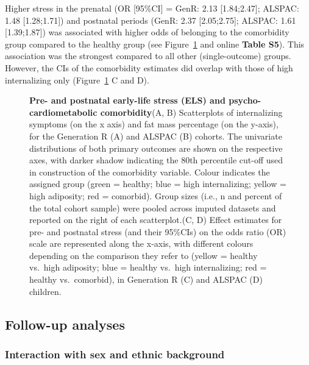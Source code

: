 \documentclass[
  letterpaper,
  DIV=11,
  numbers=noendperiod]{scrreport}
\begin{document}
Higher stress in the prenatal (OR {[}95\%CI{]} = GenR: 2.13
{[}1.84;2.47{]}; ALSPAC: 1.48 {[}1.28;1.71{]}) and postnatal periods
(GenR: 2.37 {[}2.05;2.75{]}; ALSPAC: 1.61 {[}1.39;1.87{]}) was
associated with higher odds of belonging to the comorbidity group
compared to the healthy group (see Figure~\ref{fig-1.4} and online
\textbf{Table S5}). This association was the strongest compared to all
other (single-outcome) groups. However, the CIs of the comorbidity
estimates did overlap with those of high internalizing only
(Figure~\ref{fig-1.4} C and D).

\begin{figure}[H]


\caption{\label{fig-1.4}\textbf{Pre- and postnatal early-life stress
(ELS) and psycho-cardiometabolic comorbidity}\newline(A, B) Scatterplots
of internalizing symptoms (on the x axis) and fat mass percentage (on
the y-axis), for the Generation R (A) and ALSPAC (B) cohorts. The
univariate distributions of both primary outcomes are shown on the
respective axes, with darker shadow indicating the 80th percentile
cut-off used in construction of the comorbidity variable. Colour
indicates the assigned group (green = healthy; blue = high
internalizing; yellow = high adiposity; red = comorbid). Group sizes
(i.e., n and percent of the total cohort sample) were pooled across
imputed datasets and reported on the right of each
scatterplot.\newline(C, D) Effect estimates for pre- and postnatal
stress (and their 95\%CIs) on the odds ratio (OR) scale are represented
along the x-axis, with different colours depending on the comparison
they refer to (yellow = healthy vs.~high adiposity; blue = healthy
vs.~high internalizing; red = healthy vs.~comorbid), in Generation R (C)
and ALSPAC (D) children.}

\end{figure}%

\subsection{Follow-up analyses}\label{follow-up-analyses}

\subsubsection{Interaction with sex and ethnic
background}\label{interaction-with-sex-and-ethnic-background}
\end{document}
